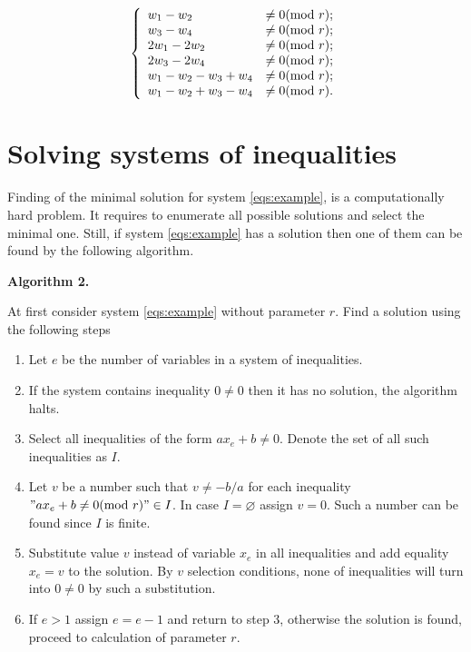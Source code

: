 \documentclass[leqno]{aadmbook}
\renewcommand{\mod}[1]{\textrm{mod}\ #1}
\begin{document}
\begin{equation}
    \centering
    \left\{
        \begin{array}{ll}
            w_1 - w_2 &\neq 0             (\mod{r}) ; \\
            w_3 - w_4 &\neq 0             (\mod{r}) ; \\
            2 w_1 - 2 w_2 &\neq 0         (\mod{r}) ; \\
            2 w_3 - 2 w_4 &\neq 0         (\mod{r}) ; \\
            w_1 - w_2 - w_3 + w_4 &\neq 0 (\mod{r}) ; \\
            w_1 - w_2 + w_3 - w_4 &\neq 0 (\mod{r}) . \\
        \end{array}
        \label{eqs:cycle_search_neqs}
    \right.
\end{equation}

\section{Solving systems of inequalities}


Finding of the minimal solution for system \eqref{eqs:example}, is a computationally hard problem. It requires to enumerate all possible solutions and select the minimal one. Still, if system \eqref{eqs:example} has a solution then one of them can be found by the following algorithm.

\textbf{Algorithm 2.}

At first consider system \eqref{eqs:example} without parameter $r$. Find a solution using the following steps

\begin{enumerate}
    \item Let $e$ be the number of variables in a system of inequalities.
    \item If the system contains inequality $0 \neq 0$ then it has no solution, the algorithm halts.
    \item Select all inequalities of the form $a x_e + b \neq 0$. Denote the set of all such inequalities as $I$.
    \item Let $v$ be a number such that $v \neq -b/a $ for each inequality $"a x_e + b \neq 0 (\mod{r})" \in I$. In case $I = \varnothing$ assign $v = 0$. Such a number can be found since $I$ is finite.
    \item Substitute value $v$ instead of variable $x_e$ in all inequalities and add equality $x_e = v$ to the solution. By $v$ selection conditions, none of inequalities will turn into $0 \neq 0$ by such a substitution. 
    \item If $e > 1$ assign $e = e - 1$ and return to step 3, otherwise the solution is found, proceed to calculation of parameter $r$.
\end{enumerate}
\end{document}
